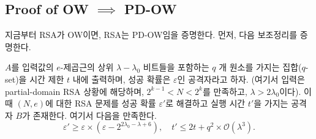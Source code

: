 

\subsection{Proof of OW $\implies$ PD-OW}

지금부터 RSA가 OW이면, RSA는 PD-OW임을 증명한다. 먼저, 다음 보조정리를 증명한다.

\begin{tcolorbox}[colback=white, sharp corners, boxrule=0.7pt]
    \begin{lemma}
        $A$를 입력값의 $e$-제곱근의 상위 $\lambda - \lambda_0$ 비트들을 포함하는 $q$ 개 원소를
        가지는 집합($q$-set)을 시간 제한 $t$ 내에 출력하며, 성공 확률은
        $\varepsilon$인 공격자라고 하자. (여기서 입력은 partial-domain RSA 상황에
        해당하며, $2^{k-1} < N < 2^k$를 만족하고, $\lambda > 2\lambda_0$이다). 이때 $(N,e)$에
        대한 RSA 문제를 성공 확률 $\varepsilon'$로 해결하고 실행 시간 $t'$을 가지는
        공격자 $B$가 존재한다. 여기서 다음을 만족한다.
        $$
            \varepsilon' \geq \varepsilon \times (\varepsilon - 2^{2\lambda_0 - \lambda + 6}), \quad 
            t' \leq 2t + q^2 \times \mathcal{O}(\lambda^3).
        $$
    \end{lemma}
\end{tcolorbox}

